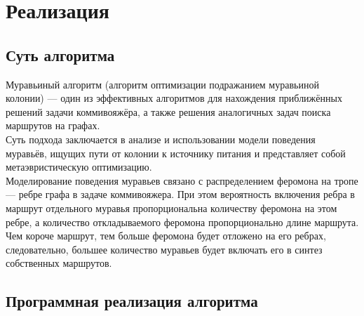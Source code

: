 \documentclass[a4paper,12pt]{article}
\begin{document}
\section*{Реализация}
\subsection*{Суть алгоритма}

Муравьиный алгоритм (алгоритм оптимизации подражанием муравьиной колонии) — один из эффективных алгоритмов для нахождения приближённых решений задачи коммивояжёра, а также решения аналогичных задач поиска маршрутов на графах. \\

Суть подхода заключается в анализе и использовании модели поведения муравьёв, ищущих пути от колонии к источнику питания и представляет собой метаэвристическую оптимизацию.\\

Моделирование поведения муравьев связано с распределением феромона на тропе — ребре графа в задаче коммивояжера. При этом вероятность включения ребра в маршрут отдельного муравья пропорциональна количеству феромона на этом ребре, а количество откладываемого феромона пропорционально длине маршрута. Чем короче маршрут, тем больше феромона будет отложено на его ребрах, следовательно, большее количество муравьев будет включать его в синтез собственных маршрутов.\\

\subsection*{Программная реализация алгоритма}
\end{document}
